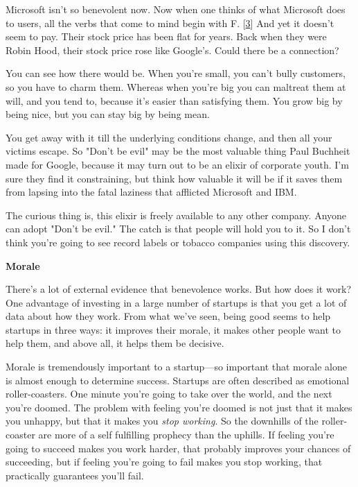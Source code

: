Microsoft
                  isn't so benevolent now. Now when one thinks of what Microsoft
                  does to users, all the verbs that come to mind begin with F.
                  [\href{\#f3n}{3}]
                  And yet it doesn't seem to pay. Their stock price has been
                  flat for years. Back when they were Robin Hood, their stock
                  price rose like Google's. Could there be a connection?

You
                  can see how there would be. When you're small, you can't bully
                  customers, so you have to charm them. Whereas when you're big
                  you can maltreat them at will, and you tend to, because it's
                  easier than satisfying them. You grow big by being nice, but
                  you can stay big by being mean.

You get away with
                  it till the underlying conditions change, and then all your
                  victims escape. So "Don't be evil" may be the most valuable
                  thing Paul Buchheit made for Google, because it may turn out
                  to be an elixir of corporate youth. I'm sure they find it
                  constraining, but think how valuable it will be if it saves
                  them from lapsing into the fatal laziness that afflicted
                  Microsoft and IBM.

The curious thing is, this
                  elixir is freely available to any other company. Anyone can
                  adopt "Don't be evil." The catch is that people will hold you
                  to it. So I don't think you're going to see record labels or
                  tobacco companies using this discovery.

\textbf{Morale}

There's a lot of external evidence that
                  benevolence works. But how does it work? One advantage of
                  investing in a large number of startups is that you get a lot
                  of data about how they work. From what we've seen, being good
                  seems to help startups in three ways: it improves their
                  morale, it makes other people want to help them, and above
                  all, it helps them be decisive.

Morale is
                  tremendously important to a startup---so important that
                  morale alone is almost enough to determine success. Startups
                  are often described as emotional roller-coasters. One minute
                  you're going to take over the world, and the next you're
                  doomed. The problem with feeling you're doomed is not just
                  that it makes you unhappy, but that it makes you
                  \emph{stop working}. So the downhills of the roller-coaster
                  are more of a self fulfilling prophecy than the uphills. If
                  feeling you're going to succeed makes you work harder, that
                  probably improves your chances of succeeding, but if feeling
                  you're going to fail makes you stop working, that practically
                  guarantees you'll fail.

